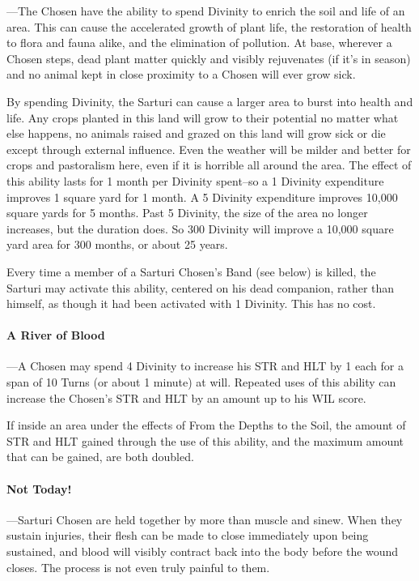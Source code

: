 \documentclass[oneside,11pt,english]{book}
\begin{document}
---\quad The Chosen have the ability to spend Divinity to enrich the soil and
life of an area. This can cause the accelerated growth of plant life, the
restoration of health to flora and fauna alike, and the elimination of
pollution. At base, wherever a Chosen steps, dead plant matter quickly and
visibly rejuvenates (if it's in season) and no animal kept in close proximity to
a Chosen will ever grow sick.


By spending Divinity, the Sarturi can cause a larger area to burst into health
and life. Any crops planted in this land will grow to their potential no matter
what else happens, no animals raised and grazed on this land will grow sick or
die except through external influence. Even the weather will be milder and
better for crops and pastoralism here, even if it is horrible all around the
area. The effect of this ability lasts for 1 month per Divinity spent--so a 1
Divinity expenditure improves 1 square yard for 1 month. A 5 Divinity
expenditure improves 10,000 square yards for 5 months. Past 5 Divinity, the size
of the area no longer increases, but the duration does. So 300 Divinity will
improve a 10,000 square yard area for 300 months, or about 25 years.


Every time a member of a Sarturi Chosen's Band (see below) is killed, the
Sarturi may activate this ability, centered on his dead companion, rather than
himself, as though it had been activated with 1 Divinity. This has no cost.
\paragraph{A River of Blood}
---\quad A Chosen may spend 4 Divinity to increase his STR and HLT by 1 each for
a span of 10 Turns (or about 1 minute) at will. Repeated uses of this ability
can increase the Chosen's STR and HLT by an amount up to his WIL score.

If inside an area under the effects of From the Depths to the Soil, the amount
of STR and HLT gained through the use of this ability, and the maximum amount
that can be gained, are both doubled.
\paragraph{Not Today!}
---\quad Sarturi Chosen are held together by more than muscle and sinew. When
they sustain injuries, their flesh can be made to close immediately upon being
sustained, and blood will visibly contract back into the body before the wound
closes. The process is not even truly painful to them.
\end{document}
